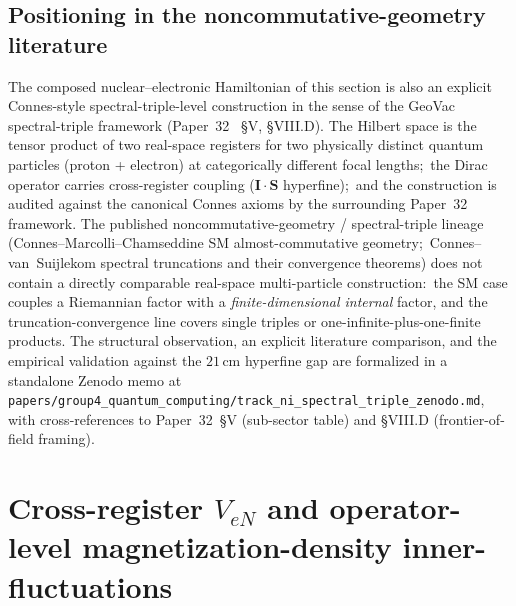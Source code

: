 \documentclass[twocolumn,prc,amsmath,amssymb,superscriptaddress]{revtex4-2}
\begin{document}
\subsection{Positioning in the noncommutative-geometry literature}

The composed nuclear--electronic Hamiltonian of this section is also
an explicit Connes-style spectral-triple-level construction in the
sense of the GeoVac spectral-triple framework (Paper~32~\cite{Paper32}
\S V, \S VIII.D). The Hilbert space is the tensor product of two
real-space registers for two physically distinct quantum particles
(proton + electron) at categorically different focal lengths;\ the
Dirac operator carries cross-register coupling
($\mathbf{I}\cdot\mathbf{S}$ hyperfine);\ and the construction is
audited against the canonical Connes axioms by the surrounding
Paper~32 framework. The published noncommutative-geometry /
spectral-triple lineage (Connes--Marcolli--Chamseddine SM
almost-commutative geometry;\ Connes--van~Suijlekom spectral
truncations and their convergence theorems) does not contain a
directly comparable real-space multi-particle construction:\ the SM
case couples a Riemannian factor with a \emph{finite-dimensional
internal} factor, and the truncation-convergence line covers single
triples or one-infinite-plus-one-finite products. The structural
observation, an explicit literature comparison, and the empirical
validation against the $21\,$cm hyperfine gap are formalized in a
standalone Zenodo memo at
\texttt{papers/group4\_quantum\_computing/track\_ni\_spectral\_triple\_zenodo.md},
with cross-references to Paper~32~\S V (sub-sector table) and
\S VIII.D (frontier-of-field framing).

\section{Cross-register $V_{eN}$ and operator-level magnetization-density
inner-fluctuations}
\label{sec:cross-register}
\end{document}
